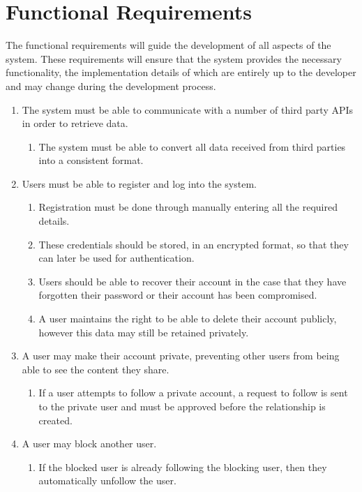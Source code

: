 \section{Functional Requirements}
The functional requirements will guide the development of all aspects of the system. These requirements will ensure that the system provides the necessary functionality, the implementation details of which are entirely up to the developer and may change during the development process.
\begin{enumerate}[label=\textbf{F\arabic*}]
	\item The system must be able to communicate with a number of third party APIs in order to retrieve data.
		\begin{enumerate}
			\item The system must be able to convert all data received from third parties into a consistent format.
		\end{enumerate}
	\item Users must be able to register and log into the system.
	\begin{enumerate}
		\item Registration must be done through manually entering all the required details.
		\item These credentials should be stored, in an encrypted format, so that they can later be used for authentication.
		\item Users should be able to recover their account in the case that they have forgotten their password or their account has been compromised.
		\item A user maintains the right to be able to delete their account publicly, however this data may still be retained privately.
	\end{enumerate}
	\item A user may make their account private, preventing other users from being able to see the content they share.
		\begin{enumerate}
			\item If a user attempts to follow a private account, a request to follow is sent to the private user and must be approved before the relationship is created.
		\end{enumerate}
	\item A user may block another user.
		\begin{enumerate}
			\item If the blocked user is already following the blocking user, then they automatically unfollow the user.

\end{enumerate}
\end{enumerate}
